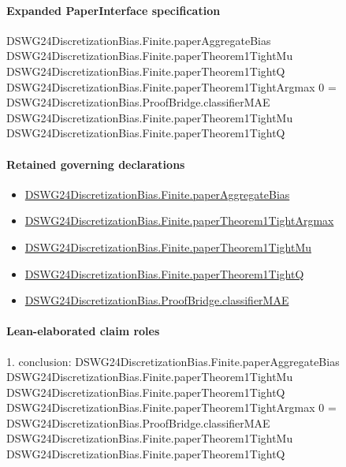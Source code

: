\documentclass[10pt]{article}
\begin{document}
\paragraph{Expanded PaperInterface specification}
\begin{ReviewVerbatim}
DSWG24DiscretizationBias.Finite.paperAggregateBias DSWG24DiscretizationBias.Finite.paperTheorem1TightMu
    DSWG24DiscretizationBias.Finite.paperTheorem1TightQ DSWG24DiscretizationBias.Finite.paperTheorem1TightArgmax 0 =
  DSWG24DiscretizationBias.ProofBridge.classifierMAE DSWG24DiscretizationBias.Finite.paperTheorem1TightMu
    DSWG24DiscretizationBias.Finite.paperTheorem1TightQ
\end{ReviewVerbatim}

\paragraph{Retained governing declarations}
\begin{itemize}\raggedright
\item \hyperlink{governing-declaration-f3bd0c0016772e11}{DSWG24\allowbreak{}Discretization\allowbreak{}Bias.\allowbreak{}Finite.\allowbreak{}paper\allowbreak{}Aggregate\allowbreak{}Bias}
\item \hyperlink{governing-declaration-9de2c431ac58b2a3}{DSWG24\allowbreak{}Discretization\allowbreak{}Bias.\allowbreak{}Finite.\allowbreak{}paper\allowbreak{}Theorem1\allowbreak{}Tight\allowbreak{}Argmax}
\item \hyperlink{governing-declaration-d4243b460c2c568f}{DSWG24\allowbreak{}Discretization\allowbreak{}Bias.\allowbreak{}Finite.\allowbreak{}paper\allowbreak{}Theorem1\allowbreak{}Tight\allowbreak{}Mu}
\item \hyperlink{governing-declaration-193c98b93e9de012}{DSWG24\allowbreak{}Discretization\allowbreak{}Bias.\allowbreak{}Finite.\allowbreak{}paper\allowbreak{}Theorem1\allowbreak{}Tight\allowbreak{}Q}
\item \hyperlink{governing-declaration-2e16128ba60f3c18}{DSWG24\allowbreak{}Discretization\allowbreak{}Bias.\allowbreak{}Proof\allowbreak{}Bridge.\allowbreak{}classifier\allowbreak{}MAE}
\end{itemize}
\paragraph{Lean-elaborated claim roles}\begin{ReviewVerbatim}
1. conclusion: DSWG24DiscretizationBias.Finite.paperAggregateBias DSWG24DiscretizationBias.Finite.paperTheorem1TightMu
    DSWG24DiscretizationBias.Finite.paperTheorem1TightQ DSWG24DiscretizationBias.Finite.paperTheorem1TightArgmax 0 =
  DSWG24DiscretizationBias.ProofBridge.classifierMAE DSWG24DiscretizationBias.Finite.paperTheorem1TightMu
    DSWG24DiscretizationBias.Finite.paperTheorem1TightQ
\end{ReviewVerbatim}
\end{document}
